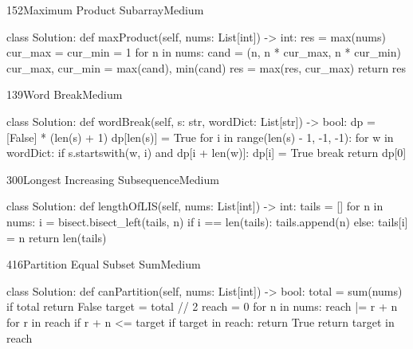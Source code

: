 \begin{problem}{152}{Maximum Product Subarray}{Medium}
\begin{code}
class Solution:
    def maxProduct(self, nums: List[int]) -> int:
        res = max(nums)
        cur_max = cur_min = 1
        for n in nums:
            cand = (n, n * cur_max, n * cur_min)
            cur_max, cur_min = max(cand), min(cand)
            res = max(res, cur_max)
        return res
\end{code}
\end{problem}

\begin{problem}{139}{Word Break}{Medium}
\begin{code}
class Solution:
    def wordBreak(self, s: str, wordDict: List[str]) -> bool:
        dp = [False] * (len(s) + 1)
        dp[len(s)] = True
        for i in range(len(s) - 1, -1, -1):
            for w in wordDict:
                if s.startswith(w, i) and dp[i + len(w)]:
                    dp[i] = True
                    break
        return dp[0]
\end{code}
\end{problem}

\begin{problem}{300}{Longest Increasing Subsequence}{Medium}
\begin{code}
class Solution:
    def lengthOfLIS(self, nums: List[int]) -> int:
        tails = []
        for n in nums:
            i = bisect.bisect_left(tails, n)
            if i == len(tails):
                tails.append(n)
            else:
                tails[i] = n
        return len(tails)
\end{code}
\end{problem}

\begin{problem}{416}{Partition Equal Subset Sum}{Medium}
\begin{code}
class Solution:
    def canPartition(self, nums: List[int]) -> bool:
        total = sum(nums)
        if total %
            return False
        target = total // 2
        reach = {0}
        for n in nums:
            reach |= {r + n for r in reach if r + n <= target}
            if target in reach:
                return True
        return target in reach
\end{code}
\end{problem}

